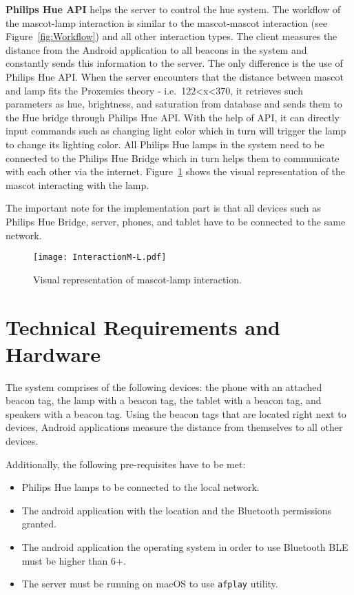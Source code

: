 \textbf{Philips Hue API} helps the server to control the hue system.
The workflow of the mascot-lamp interaction is similar to the mascot-mascot interaction (see Figure~\ref{fig:Workflow})
and all other interaction types.
The client measures the distance from the Android application to all beacons
in the system and constantly sends this information to the server.
The only difference is the use of Philips Hue API\@.
When the server encounters that the distance between mascot and lamp fits the Proxemics theory - i.e.\ 122<x<370, it
retrieves such parameters as hue, brightness, and saturation from database and sends them
to the Hue bridge through Philips Hue API\@.
With the help of API, it can directly input commands such as changing light color which in turn will trigger the lamp to
change its lighting color.
All Philips Hue lamps in the system need to be connected to the Philips Hue Bridge which in turn helps them
to communicate with each other via the internet.
Figure~\ref{fig:InteractionMl} shows the visual representation of the mascot interacting with the lamp.

The important note for the implementation part is that all devices such as Philips Hue Bridge, server,
phones, and tablet have to be connected to the same network.
\begin{figure}[hbt!]
    \centering
    \texttt{[image: InteractionM-L.pdf]}
    \caption{Visual representation of mascot-lamp interaction.}
    \label{fig:InteractionMl}
\end{figure}

\section{Technical Requirements and Hardware}
\label{sec:technical-requirements-and-hardware}
The system comprises of the following devices: the phone with an attached beacon tag,
the lamp with a beacon tag, the tablet with a beacon tag, and speakers with a beacon tag.
Using the beacon tags that are located right next to devices, Android applications
measure the distance from themselves to all other devices.

Additionally, the following pre-requisites have to be met:
\begin{itemize}
    \item Philips Hue lamps to be connected to the local network.
    \item The android application with the location and the Bluetooth permissions granted.
    \item The android application the operating system in order to use Bluetooth BLE must be higher than 6+.
    \item The server must be running on macOS to use \texttt{afplay} utility.
\end{itemize}

